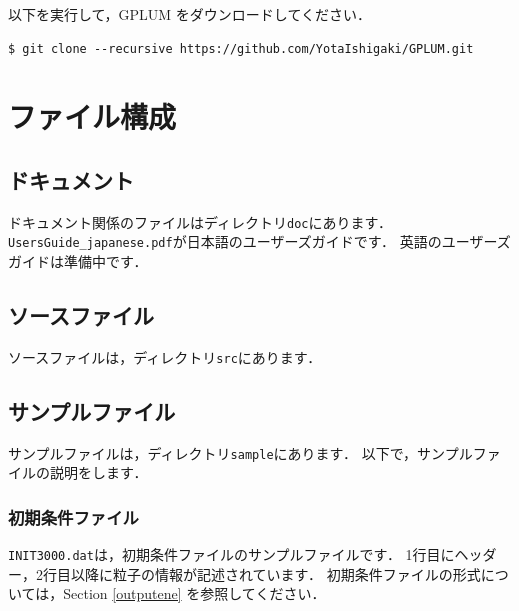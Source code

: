 \documentclass[12pt,a4paper,dvipdfmx]{jsarticle}
\newcommand{\ourcode}{GPLUM\xspace}
\begin{document}
以下を実行して，\ourcode をダウンロードしてください．
\begin{verbatim}
$ git clone --recursive https://github.com/YotaIshigaki/GPLUM.git
\end{verbatim}



\section{ファイル構成}

\subsection{ドキュメント}
ドキュメント関係のファイルはディレクトリ\texttt{doc}にあります．
\texttt{UsersGuide\_japanese.pdf}が日本語のユーザーズガイドです．
英語のユーザーズガイドは準備中です．

\subsection{ソースファイル}
ソースファイルは，ディレクトリ\texttt{src}にあります．

\subsection{サンプルファイル}
サンプルファイルは，ディレクトリ\texttt{sample}にあります．
以下で，サンプルファイルの説明をします．
\subsubsection{初期条件ファイル}
\texttt{INIT3000.dat}は，初期条件ファイルのサンプルファイルです．
1行目にヘッダー，2行目以降に粒子の情報が記述されています．
初期条件ファイルの形式については，Section \ref{outputene} を参照してください．
\end{document}
